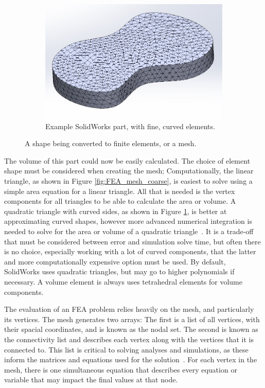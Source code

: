\begin{figure}
\begin{subfigure}[h]{0.6\textwidth}
        \includegraphics[width=\textwidth]{chap3_images/mesh_test_part_fine_mesh.JPG}
        \caption{Example SolidWorks part, with fine, curved elements.}
        \label{fig:FEA_mesh_fine}
    \end{subfigure}
    \caption{A shape being converted to finite elements, or a mesh.}
    \label{FEA_mesh_example}
\end{figure}

The volume of this part could now be easily calculated. The choice of element shape must be considered when creating the mesh; Computationally, the linear triangle, as shown in Figure \ref{fig:FEA_mesh_coarse}, is easiest to solve using a simple area equation for a linear triangle. All that is needed is the vertex components for all triangles to be able to calculate the area or volume. A quadratic triangle with curved sides, as shown in Figure \ref{fig:FEA_mesh_fine}, is better at approximating curved shapes, however more advanced numerical integration is needed to solve for the area or volume of a quadratic triangle~\citep{FEA_SW}. It is a trade-off that must be considered between error and simulation solve time, but often there is no choice, especially working with a lot of curved components, that the latter and more computationally expensive option must be used. By default, SolidWorks uses quadratic triangles, but may go to higher polynomials if necessary. A volume element is always uses tetrahedral elements for volume components. 

The evaluation of an FEA problem relies heavily on the mesh, and particularly its vertices. The mesh generates two arrays: The first is a list of all vertices, with their spacial coordinates, and is known as the nodal set. The second is known as the connectivity list and describes each vertex along with the vertices that it is connected to. This list is critical to solving analyses and simulations, as these inform the matrices and equations used for the solution~\citep{FEA_SW}. For each vertex in the mesh, there is one simultaneous equation that describes every equation or variable that may impact the final values at that node. 

